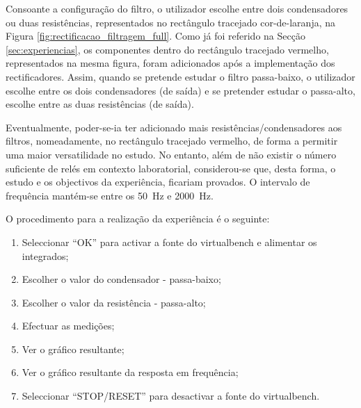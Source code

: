 Consoante a configuração do filtro, o utilizador escolhe entre dois condensadores ou duas resistências, representados no rectângulo tracejado cor-de-laranja, na Figura \ref{fig:rectificacao_filtragem_full}. Como já foi referido na Secção \ref{sec:experiencias}, os componentes dentro do rectângulo tracejado vermelho, representados na mesma figura, foram adicionados após a implementação dos rectificadores. Assim, quando se pretende estudar o filtro passa-baixo, o utilizador escolhe entre os dois condensadores (de saída) e se pretender estudar o passa-alto, escolhe entre as duas resistências (de saída). 

Eventualmente, poder-se-ia ter adicionado mais resistências/condensadores aos filtros, nomeadamente, no rectângulo tracejado vermelho, de forma a permitir uma maior versatilidade no estudo. No entanto, além de não existir o número suficiente de relés em contexto laboratorial, considerou-se que, desta forma, o estudo e os objectivos da experiência, ficariam provados. O intervalo de frequência mantém-se entre os \SI{50}{\hertz} e \SI{2000}{\hertz}. 

O procedimento para a realização da experiência é o seguinte:
\begin{enumerate}
	\item Seleccionar ``OK'' para activar a fonte do \acrshort{virtualbench} e alimentar os integrados;
	\item Escolher o valor do condensador - passa-baixo;
	\item Escolher o valor da resistência - passa-alto;
	\item Efectuar as medições;
	\item Ver o gráfico resultante;
	\item Ver o gráfico resultante da resposta em frequência;
	\item Seleccionar ``STOP/RESET'' para desactivar a fonte do \acrshort{virtualbench}.
\end{enumerate}
